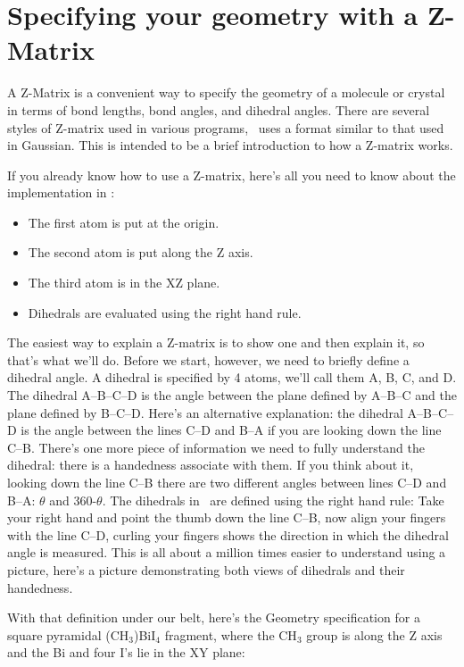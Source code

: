 \chapter{Specifying your geometry with a Z-Matrix}

A Z-Matrix is a convenient way to specify the geometry of a molecule or
crystal in terms of bond lengths, bond angles, and dihedral angles.
There are several styles of Z-matrix used in various programs,
\calcprog\ uses a format similar to that used in Gaussian.
This is intended to be a brief introduction to how a Z-matrix works.

If you already know how to use a Z-matrix, here's all you need to know
about the implementation in \calcprog:
\begin{itemize}
\item The first atom is put at the origin.
\item The second atom is put along the Z axis.
\item The third atom is in the XZ plane.
\item Dihedrals are evaluated using the right hand rule.
\end{itemize}

The easiest way to explain a Z-matrix is to show one and then explain
it, so that's what we'll do.  Before we start, however, we need to
briefly define a dihedral angle.  A dihedral is specified by 4
atoms, we'll call them A, B, C, and D.  The dihedral A--B--C--D is the
angle between the plane defined by A--B--C and the plane defined by
B--C--D.
Here's an alternative explanation: the dihedral A--B--C--D is the angle
between the lines C--D and B--A if you are looking down the line C--B.
There's one more piece of information we need to fully understand the
dihedral: there is a handedness associate with them.  If you think
about it, looking down the line C--B there are two different angles
between lines C--D and B--A: $\theta$ and 360-$\theta$.  The dihedrals
in \calcprog\ are defined using the right hand rule:  Take your right
hand and point the thumb down the line C--B, now align your fingers
with the line C--D, curling your fingers shows the direction in which
the dihedral angle is measured.
%
This is all about a million times easier to understand using a
picture, here's a picture demonstrating both views of dihedrals and
their handedness. 
%
\begin{center}
\end{center}
%

With that definition under our belt, here's the Geometry specification for a 
square pyramidal (CH$_3$)BiI$_4$ fragment, where the CH$_3$ group is
along the Z axis and the Bi and four I's lie in the XY plane:

